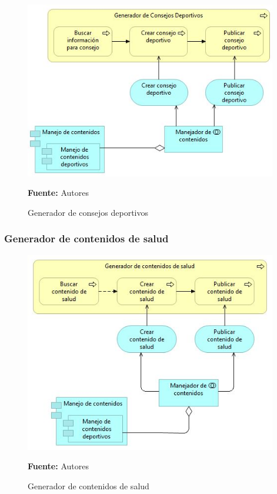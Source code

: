 \begin{figure}[!htb]
  \begin{center}
    \includegraphics[width=11cm]{./imagenes/application_usage/generadorconsejosdeportivos.png}
    \caption{Generador de consejos deportivos}
    \label{fig:BP_GeneradorConsejosDeportivos}
    \textbf{Fuente:}  Autores
  \end{center}
\end{figure}

\subsubsection{Generador de contenidos de salud}

\begin{figure}[!htb]
  \begin{center}
    \includegraphics[width=11cm]{./imagenes/application_usage/generadorcontenidossalud.png}
    \caption{Generador de contenidos de salud}
    \label{fig:BP_GeneradorContenidosSalud}
    \textbf{Fuente:}  Autores
  \end{center}
\end{figure}

